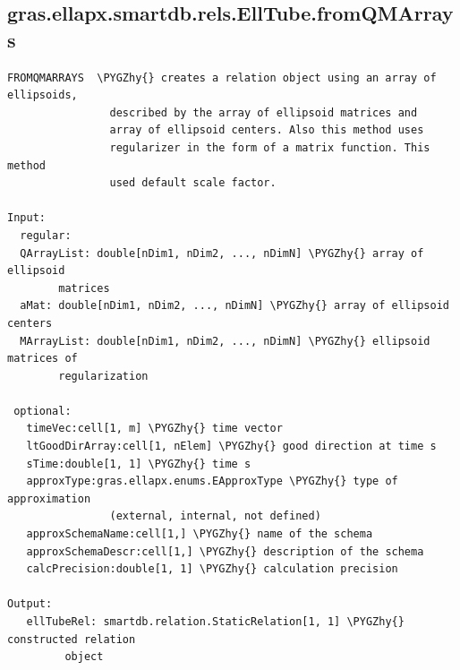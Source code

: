 \documentclass[letterpaper,10pt,english]{sphinxmanual}
\def\PYGZhy{\char`\-}
\begin{document}
\subsection{gras.ellapx.smartdb.rels.EllTube.fromQMArrays}
\label{chap_functions:gras-ellapx-smartdb-rels-elltube-fromqmarrays}
\begin{Verbatim}[commandchars=\\\{\}]
FROMQMARRAYS  \PYGZhy{} creates a relation object using an array of ellipsoids,
                described by the array of ellipsoid matrices and
                array of ellipsoid centers. Also this method uses
                regularizer in the form of a matrix function. This method
                used default scale factor.

Input:
  regular:
  QArrayList: double[nDim1, nDim2, ..., nDimN] \PYGZhy{} array of ellipsoid
        matrices
  aMat: double[nDim1, nDim2, ..., nDimN] \PYGZhy{} array of ellipsoid centers
  MArrayList: double[nDim1, nDim2, ..., nDimN] \PYGZhy{} ellipsoid  matrices of
        regularization

 optional:
   timeVec:cell[1, m] \PYGZhy{} time vector
   ltGoodDirArray:cell[1, nElem] \PYGZhy{} good direction at time s
   sTime:double[1, 1] \PYGZhy{} time s
   approxType:gras.ellapx.enums.EApproxType \PYGZhy{} type of approximation
                (external, internal, not defined)
   approxSchemaName:cell[1,] \PYGZhy{} name of the schema
   approxSchemaDescr:cell[1,] \PYGZhy{} description of the schema
   calcPrecision:double[1, 1] \PYGZhy{} calculation precision

Output:
   ellTubeRel: smartdb.relation.StaticRelation[1, 1] \PYGZhy{} constructed relation
         object
\end{Verbatim}
\end{document}
